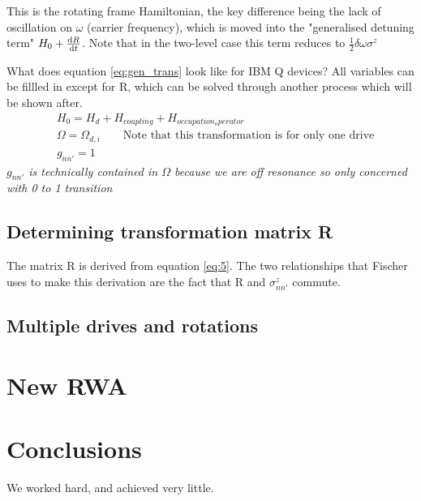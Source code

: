 \documentclass[12pt]{article}
\begin{document}
This is the rotating frame Hamiltonian, the key difference being the lack of oscillation on $\omega$ (carrier frequency), 
which is moved into the "generalised detuning term" $H_0 + \derivative{R}{t}$. Note that in the two-level case this term 
reduces to $\frac{1}{2} \delta \omega \sigma^z$

What does equation \eqref{eq:gen_trans} look like for IBM Q devices? All variables can be fillled in except for R,
which can be solved through another process which will be shown after.
\begin{align}
        & H_0 = H_d + H_{coupling} + H_{occupation_operator} \\
        & \Omega = \Omega_{d,i} \qquad \text{Note that this transformation is for only one drive} \\
        & g_{nn'} = 1
\end{align}
\textit{$g_{nn'}$ is technically contained in $\Omega$ because we are off resonance so only concerned with 0 to 1 transition}

\subsection{Determining transformation matrix R}
The matrix R is derived from equation \eqref{eq:5}. The two relationships that Fischer uses to make this derivation are the 
fact that R and $\sigma^z_{nn'}$ commute.

\subsection{Multiple drives and rotations}

\section{New RWA}


\section{Conclusions}\label{conclusions}
We worked hard, and achieved very little.



\end{document}
